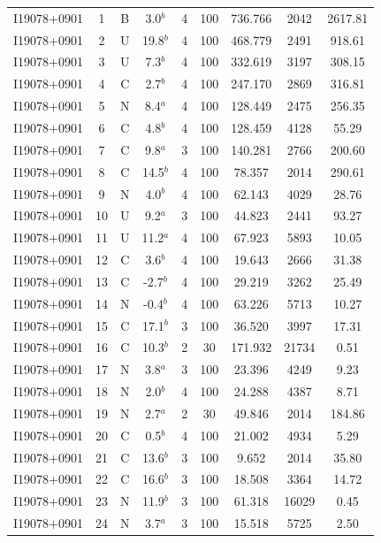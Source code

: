\begin{table}
\begin{tabular}{ccccccccc}
I19078+0901 & 1 & B & 3.0$^{b}$ & 4 & 100 & 736.766 & 2042 & 2617.81 \\
I19078+0901 & 2 & U & 19.8$^{b}$ & 4 & 100 & 468.779 & 2491 & 918.61 \\
I19078+0901 & 3 & U & 7.3$^{b}$ & 4 & 100 & 332.619 & 3197 & 308.15 \\
I19078+0901 & 4 & C & 2.7$^{b}$ & 4 & 100 & 247.170 & 2869 & 316.81 \\
I19078+0901 & 5 & N & 8.4$^{a}$ & 4 & 100 & 128.449 & 2475 & 256.35 \\
I19078+0901 & 6 & C & 4.8$^{b}$ & 4 & 100 & 128.459 & 4128 & 55.29 \\
I19078+0901 & 7 & C & 9.8$^{a}$ & 3 & 100 & 140.281 & 2766 & 200.60 \\
I19078+0901 & 8 & C & 14.5$^{b}$ & 4 & 100 & 78.357 & 2014 & 290.61 \\
I19078+0901 & 9 & N & 4.0$^{b}$ & 4 & 100 & 62.143 & 4029 & 28.76 \\
I19078+0901 & 10 & U & 9.2$^{a}$ & 3 & 100 & 44.823 & 2441 & 93.27 \\
I19078+0901 & 11 & U & 11.2$^{a}$ & 4 & 100 & 67.923 & 5893 & 10.05 \\
I19078+0901 & 12 & C & 3.6$^{b}$ & 4 & 100 & 19.643 & 2666 & 31.38 \\
I19078+0901 & 13 & C & -2.7$^{b}$ & 4 & 100 & 29.219 & 3262 & 25.49 \\
I19078+0901 & 14 & N & -0.4$^{b}$ & 4 & 100 & 63.226 & 5713 & 10.27 \\
I19078+0901 & 15 & C & 17.1$^{b}$ & 3 & 100 & 36.520 & 3997 & 17.31 \\
I19078+0901 & 16 & C & 10.3$^{b}$ & 2 & 30 & 171.932 & 21734 & 0.51 \\
I19078+0901 & 17 & N & 3.8$^{a}$ & 3 & 100 & 23.396 & 4249 & 9.23 \\
I19078+0901 & 18 & N & 2.0$^{b}$ & 4 & 100 & 24.288 & 4387 & 8.71 \\
I19078+0901 & 19 & N & 2.7$^{a}$ & 2 & 30 & 49.846 & 2014 & 184.86 \\
I19078+0901 & 20 & C & 0.5$^{b}$ & 4 & 100 & 21.002 & 4934 & 5.29 \\
I19078+0901 & 21 & C & 13.6$^{b}$ & 3 & 100 & 9.652 & 2014 & 35.80 \\
I19078+0901 & 22 & C & 16.6$^{b}$ & 3 & 100 & 18.508 & 3364 & 14.72 \\
I19078+0901 & 23 & N & 11.9$^{b}$ & 3 & 100 & 61.318 & 16029 & 0.45 \\
I19078+0901 & 24 & N & 3.7$^{a}$ & 3 & 100 & 15.518 & 5725 & 2.50 \\

\end{tabular}
\end{table}
